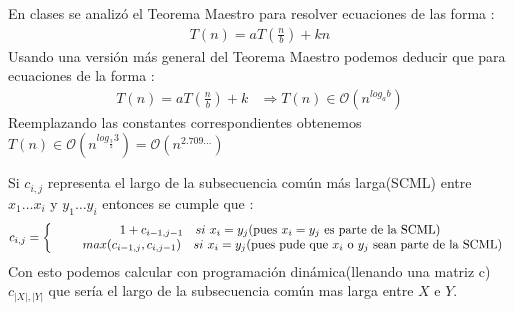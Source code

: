 \documentclass[dcc]{fcfmcourse}
\begin{document}
\begin{problems}
\begin{enumerate}
En clases se analizó el Teorema Maestro para resolver ecuaciones de las forma :
\begin{align*}
T(n) = aT\left(\frac{n}{b}\right) + kn
\end{align*}
Usando una versión más general del Teorema Maestro podemos deducir que para ecuaciones de la forma :
\begin{align*}
T(n) = aT\left(\frac{n}{b}\right) + k & \Rightarrow T(n) \in \mathcal{O}\left(n^{log_{a}b}\right)
\end{align*}
Reemplazando las constantes correspondientes obtenemos  $T(n)\in \mathcal{O}( n^{log_{\frac{3}{2}} 3})= \mathcal{O}( n^{2.709\ldots})$
\end{enumerate}

\problem Si $c_{i,j}$ representa el largo de la subsecuencia común más larga(SCML) entre $x_{1}\ldots x_{i}$ y $y_{1}\ldots y_{i}$ entonces se cumple que :\\
$$c_{i,j} = \left\{
\begin{array}{c l}
 1 + c_{i-1,j-1}\quad si\ x_{i}=y_{j}\text{(pues $x_{i}=y_{j}$ es parte de la SCML)}\\
 \quad \quad max(c_{i-1,j}, c_{i,j-1})\quad si\ x_{i}=y_{j}\text{(pues pude que $x_{i}$ o $y_{j}$ sean parte de la SCML)}
\end{array}
\right.
$$
Con esto podemos calcular con programación dinámica(llenando una matriz c) $c_{|X|,|Y|}$ que sería el largo de la subsecuencia común mas larga entre $X$ e $Y$.\\


\end{problems}
\end{document}
